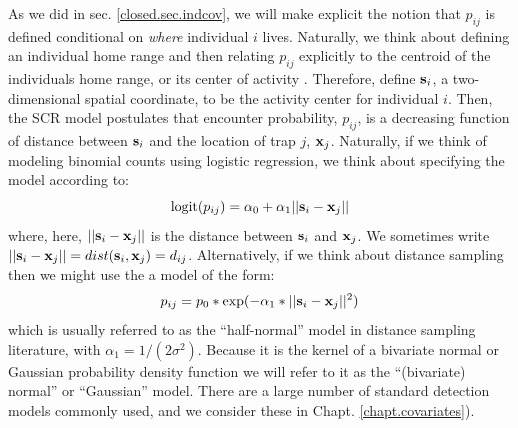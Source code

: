 As we did in sec. \ref{closed.sec.indcov}, we will make explicit the
notion that $p_{ij}$ is defined conditional on {\it where} individual
$i$ lives. Naturally, we think about defining an individual home range
and then relating $p_{ij}$ explicitly to the centroid of the
individuals home range, or its center of activity \citep{efford:2004,
  borchers_efford:2008, royle_young:2008}.  Therefore, define ${\bf
  s}_{i}$, a two-dimensional spatial coordinate, to be the activity
center for individual $i$. Then, the SCR model postulates that
encounter probability, $p_{ij}$, is a decreasing function of distance
between ${\bf s}_{i}$ and the location of trap $j$, ${\bf x}_{j}$.
Naturally, if we think of modeling binomial counts using logistic
regression, we think about specifying the model according to:
\begin{equation}
	\mbox{logit}(p_{ij}) = \alpha_{0} + \alpha_1 ||{\bf s}_{i}-{\bf x}_{j} ||
\label{scr0.eq.logit}
\end{equation}
where, here, $||{\bf s}_{i}-{\bf x}_{j}||$ is the distance between
${\bf s}_{i}$ and ${\bf x}_{j}$. We sometimes write $||{\bf
  s}_{i}-{\bf x}_{j}|| = dist({\bf s}_{i},{\bf x}_{j}) =
d_{ij}$. Alternatively, if we think about distance sampling then we
might use the a model of the form:
\begin{equation}
p_{ij} = p_{0}*\exp(-\alpha_{1} *||{\bf s}_{i}-{\bf x}_{j}||^2)
\label{scr0.eq.norm}
\end{equation}
which is usually referred to as the ``half-normal'' model in distance
sampling literature, with $\alpha_{1} = 1/(2\sigma^{2})$.  Because it
is the kernel of a bivariate normal or Gaussian probability density
function we will refer to it as the ``(bivariate) normal'' or
``Gaussian'' model.  There are a large number of standard detection
models commonly used, and we consider these in
Chapt. \ref{chapt.covariates}). 
